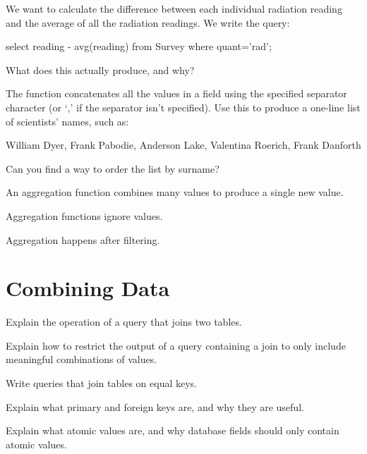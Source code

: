 \begin{challenge}
  We want to calculate the difference between each individual radiation
  reading and the average of all the radiation readings. We write the
  query:

\begin{VerbIn}
select reading - avg(reading) from Survey where quant='rad';
\end{VerbIn}

  What does this actually produce, and why?
\end{challenge}

\begin{challenge}
  The function  concatenates all
  the values in a field using the specified separator character (or `,'
  if the separator isn't specified). Use this to produce a one-line list
  of scientists' names, such as:

\begin{VerbIn}
William Dyer, Frank Pabodie, Anderson Lake, Valentina Roerich, Frank Danforth
\end{VerbIn}

  Can you find a way to order the list by surname?
\end{challenge}

\begin{keypoints}
\begin{swcitemize}
\item
  An aggregation function combines many values to produce a single new
  value.
\item
  Aggregation functions ignore  values.
\item
  Aggregation happens after filtering.
\end{swcitemize}
\end{keypoints}

\section{Combining Data}

\begin{objectives}
\begin{swcitemize}
\item
  Explain the operation of a query that joins two tables.
\item
  Explain how to restrict the output of a query containing a join to
  only include meaningful combinations of values.
\item
  Write queries that join tables on equal keys.
\item
  Explain what primary and foreign keys are, and why they are useful.
\item
  Explain what atomic values are, and why database fields should only
  contain atomic values.
\end{swcitemize}
\end{objectives}

